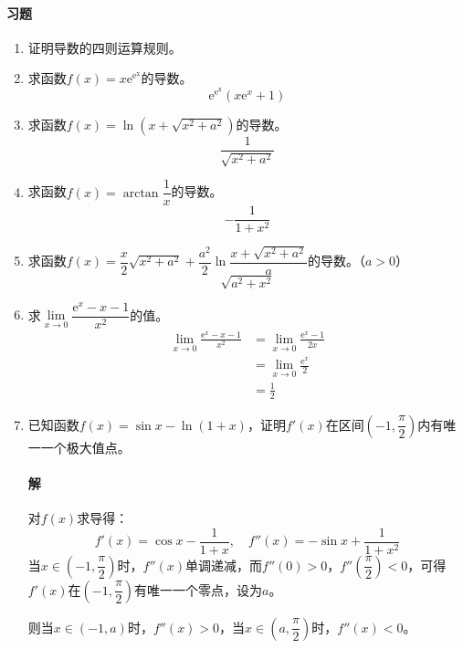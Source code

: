 \documentclass[fontset=none,openany,a4paper]{ctexbook}
\begin{document}
\paragraph{习题}

\begin{enumerate}

    \item 证明导数的四则运算规则。

    \item 求函数$f(x)=x\mathrm{e^{\mathrm{e}^x}}$的导数。
    \[
    \mathrm{e^{\mathrm{e}^x}}(x\mathrm{e}^x + 1)
    \]

    \item 求函数$f(x)=\ln(x+\sqrt{x^2+a^2})$的导数。
    \[
    \frac{1}{\sqrt{x^2+a^2}}
    \]

    \item 求函数$f(x)=\arctan\dfrac{1}{x}$的导数。
    \[
    -\frac{1}{1+x^2}
    \]

    \item 求函数$f(x)=\dfrac{x}{2}\sqrt{x^2+a^2}+\dfrac{a^2}{2}\ln\dfrac{x+\sqrt{x^2+a^2}}{a}$的导数。（$a>0$）
    \[
    \sqrt{a^2+x^2}
    \]

    \item 求$\lim\limits_{x\to0}\dfrac{\mathrm{e}^x-x-1}{x^2}$的值。
    \begin{align*}
        \lim_{x\to0}\frac{\mathrm{e}^x-x-1}{x^2}
        &= \lim_{x\to0}\frac{\mathrm{e}^x-1}{2x} \\
        &= \lim_{x\to0}\frac{\mathrm{e}^x}{2} \\
        &= \frac{1}{2}
    \end{align*}

    \item 已知函数$f(x)=\sin x-\ln(1+x)$，证明$f'(x)$在区间$\left(-1,\dfrac{\pi}{2}\right)$内有唯一一个极大值点。

    \paragraph{解}

    对$f(x)$求导得：
    \[
    f'(x) = \cos x - \frac{1}{1+x},\quad f''(x) = -\sin x + \frac{1}{1+x^2}
    \]
    当$x\in\left(-1,\dfrac{\pi}{2}\right)$时，$f''(x)$单调递减，而$f''(0)>0$，$f''\left(\dfrac{\pi}{2}\right)<0$，可得$f'(x)$在$\left(-1,\dfrac{\pi}{2}\right)$有唯一一个零点，设为$a$。

    则当$x\in(-1,a)$时，$f''(x)>0$，当$x\in\left(a,\dfrac{\pi}{2}\right)$时，$f''(x)<0$。


\end{enumerate}
\end{document}
